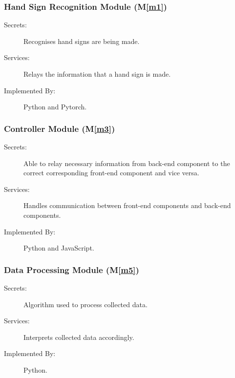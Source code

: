 \documentclass[12pt, titlepage]{article}
\newcommand{\mref}[1]{M\ref{#1}}
\begin{document}
\subsubsection{Hand Sign Recognition Module (\mref{m1})}
\begin{description}
\item[Secrets:] Recognises hand signs are being made.
\item[Services:] Relays the information that a hand sign is made.
\item[Implemented By:] Python and Pytorch.
\end{description}

\subsubsection{Controller Module (\mref{m3})}
\begin{description}
\item[Secrets:] Able to relay necessary information from back-end component to the correct corresponding front-end component and vice versa.
\item[Services:] Handles communication between front-end components and back-end components.
\item[Implemented By:] Python and JavaScript.
\end{description}

\subsubsection{Data Processing Module (\mref{m5})}
\begin{description}
\item[Secrets:] Algorithm used to process collected data.
\item[Services:] Interprets collected data accordingly.
\item[Implemented By:] Python.
\end{description}
\end{document}

